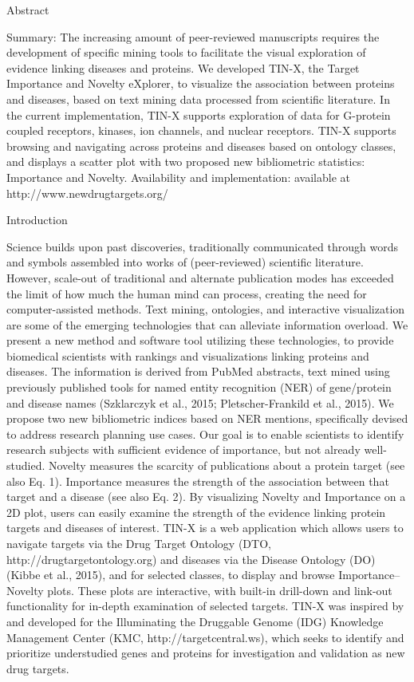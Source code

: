 Abstract

Summary: The increasing amount of peer-reviewed manuscripts requires the development of specific mining tools to facilitate the visual exploration of evidence linking diseases and proteins. We developed TIN-X, the Target Importance and Novelty eXplorer, to visualize the association between proteins and diseases, based on text mining data processed from scientific literature. In the current implementation, TIN-X supports exploration of data for G-protein coupled receptors, kinases, ion channels, and nuclear receptors. TIN-X supports browsing and navigating across proteins and diseases based on ontology classes, and displays a scatter plot with two proposed new bibliometric statistics: Importance and Novelty. 
Availability  and implementation:  available at http://www.newdrugtargets.org/

Introduction

Science builds upon past discoveries, traditionally communicated through words and symbols assembled into works of (peer-reviewed) scientific literature. However, scale-out of traditional and alternate publication modes has exceeded the limit of how much the human mind can process, creating the need for computer-assisted methods. Text mining, ontologies, and interactive visualization are some of the emerging technologies that can alleviate information overload. We present a new method and software tool utilizing these technologies, to provide biomedical scientists with rankings and visualizations linking proteins and diseases.  The information is derived from PubMed abstracts, text mined using previously published tools for named entity recognition (NER) of gene/protein and disease names (Szklarczyk et al., 2015; Pletscher-Frankild et al., 2015). We propose two new bibliometric indices based on NER mentions, specifically devised to address research planning use cases. Our goal is to enable scientists to identify research subjects with sufficient evidence of importance, but not already well-studied. Novelty measures the scarcity of publications about a protein target (see also Eq. 1). Importance measures the strength of the association between that target and a disease (see also Eq. 2). By visualizing Novelty and Importance on a 2D plot, users can easily examine the strength of the evidence linking protein targets and diseases of interest. TIN-X is a web application which allows users to navigate targets via the Drug Target Ontology (DTO, http://drugtargetontology.org) and diseases via the Disease Ontology (DO) (Kibbe et al., 2015), and for selected classes, to display and browse Importance–Novelty plots. These plots are interactive, with built-in drill-down and link-out functionality for in-depth examination of selected targets. TIN-X was inspired by and developed for the Illuminating the Druggable Genome (IDG) Knowledge Management Center (KMC, http://targetcentral.ws), which seeks to identify and prioritize understudied genes and proteins for investigation and validation as new drug targets.

